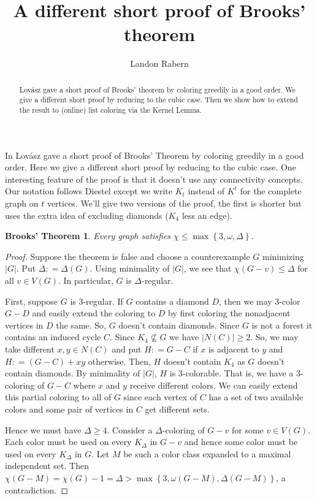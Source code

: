 \documentclass[12pt]{amsart}
\title{A different short proof of Brooks' theorem}
\author{Landon Rabern}
\theoremstyle{plain}
\newtheorem*{Brooks}{Brooks' Theorem}
\theoremstyle{definition}
\theoremstyle{remark}
\newcommand{\set}[1]{\left\{ #1 \right\}}
\newcommand{\card}[1]{\left|#1\right|}
\newcommand{\DefinedAs}{\mathrel{\mathop:}=}
\begin{document}
\begin{abstract}
Lov\'{a}sz gave a short proof of Brooks' theorem by coloring greedily in a good
order. We give a different short proof by reducing to the cubic case.  Then we show how to extend the result to (online) list coloring via the Kernel Lemma.
\end{abstract}
\maketitle

In \cite{Lovasz1975269} Lov\'{a}sz gave a short proof of Brooks' Theorem \cite{brooks1941colouring} by
coloring greedily in a good order. Here we give a different short proof by reducing to the cubic case.  One
interesting feature of the proof is that it doesn't use any connectivity
concepts. Our notation follows Diestel \cite{Diestel} except we write $K_t$ instead of $K^t$ for the complete graph on $t$ vertices.  We'll give two versions of the proof, the first is shorter but uses the extra idea of excluding diamonds ($K_4$ less an edge).

\begin{Brooks}
Every graph satisfies $\chi \leq \max\set{3, \omega, \Delta}$.
\end{Brooks}
\begin{proof}
Suppose the theorem is false and choose a counterexample $G$ minimizing
$\card{G}$.  Put $\Delta \DefinedAs \Delta(G)$. Using minimality of $\card{G}$,
we see that $\chi(G - v) \leq \Delta$ for all $v \in
V(G)$. In particular, $G$ is $\Delta$-regular.

First, suppose $G$ is $3$-regular.  If $G$ contains a diamond $D$, then we may $3$-color $G-D$ and easily extend the coloring to $D$ by first coloring the nonadjacent vertices in $D$ the same.  So, $G$ doesn't contain diamonds. Since $G$ is not a forest it contains an induced cycle $C$. Since $K_4 \not
\subseteq G$ we have $\card{N(C)} \geq 2$. So, we may take different $x, y \in N(C)$ and put $H \DefinedAs G - C$ if $x$ is adjacent to $y$ and $H \DefinedAs (G-C) + xy$ otherwise.  Then, $H$ doesn't contain $K_4$ as $G$ doesn't contain diamonds. By minimality of $\card{G}$, $H$ is $3$-colorable. That is, we have a $3$-coloring of $G - C$ where $x$ and $y$ receive different colors.  We can easily extend this partial
coloring to all of $G$ since each vertex of $C$ has a set of two available
colors and some pair of vertices in $C$ get different sets.  

Hence we must have $\Delta \geq 4$. Consider a $\Delta$-coloring of $G-v$ for some $v \in V(G)$.  Each color must be used on every $K_{\Delta}$ in $G-v$ and hence some color must be used on every $K_{\Delta}$ in $G$.  Let $M$ be such a color class expanded to a maximal independent set.  Then $\chi(G-M) = \chi(G) - 1 = \Delta > \max\set{3, \omega(G-M), \Delta(G-M)}$, a contradiction.
\end{proof}
\end{document}
